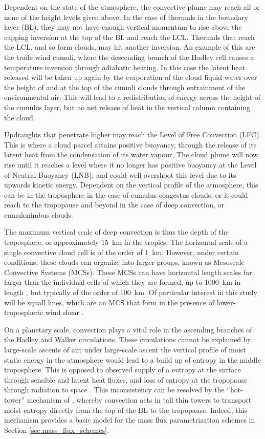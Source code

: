 \documentclass[11pt,a4paper]{article}
\begin{document}
Dependent on the state of the atmosphere, the convective plume may reach all or none of the height levels given above. In the case of thermals in the boundary layer (BL), they may not have enough vertical momentum to rise above the capping inversion at the top of the BL and reach the LCL. Thermals that reach the LCL, and so form clouds, may hit another inversion. An example of this are the trade wind cumuli, where the descending branch of the Hadley cell causes a temperature inversion through adiabatic heating. In this case the latent heat released will be taken up again by the evaporation of the cloud liquid water over the height of and at the top of the cumuli clouds through entrainment of the environmental air. This will lead to a redistribution of energy across the height of the cumulus layer, but no net release of heat in the vertical column containing the cloud.

Updraughts that penetrate higher may reach the Level of Free Convection (LFC). This is where a cloud parcel attains positive buoyancy, through the release of its latent heat from the condensation of its water vapour. The cloud plume will now rise until it reaches a level where it no longer has positive buoyancy at the Level of Neutral Buoyancy (LNB), and could well overshoot this level due to its upwards kinetic energy. Dependent on the vertical profile of the atmosphere, this can be in the troposphere in the case of cumulus congestus clouds, or it could reach to the tropopause and beyond in the case of deep convection, or cumulonimbus clouds.

The maximum vertical scale of deep convection is thus the depth of the troposphere, or approximately \SI{15}{km} in the tropics. The horizontal scale of a single convective cloud cell is of the order of \SI{1}{km}. However, under certain conditions, these clouds can organize into larger groups, known as Mesoscale Convective Systems (MCSs). These MCSs can have horizontal length scales far larger than the individual cells of which they are formed, up to \SI{1000}{km} in length \parencite{redelsperger1997mesoscale}, but typically of the order of \SI{100}{km}. Of particular interest in this study will be squall lines, which are an MCS that form in the presence of lower-tropospheric wind shear \parencite{rotunno1988theory}.

On a planetary scale, convection plays a vital role in the ascending branches of the Hadley and Walker circulations. These circulations cannot be explained by large-scale ascents of air; under large-scale ascent the vertical profile of moist static energy in the atmosphere would lead to a build up of entropy in the middle troposphere. This is opposed to observed supply of a entropy at the surface through sensible and latent heat fluxes, and loss of entropy at the tropopause through radiation to space \parencite{yano2016hot}. This inconsistency can be resolved by the ``hot-tower'' mechanism of \cite{riehl1958heat}, whereby convection acts in tall thin towers to transport moist entropy directly from the top of the BL to the tropopause. Indeed, this mechanism provides a basic model for the mass flux parametrization schemes in Section \ref{sec:mass_flux_schemes}.
\end{document}
